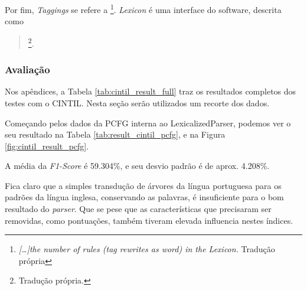 Por fim, \textit{Taggings} se refere a 
\footnote{\textit{[\ldots]the number of rules (tag rewrites as word) in the Lexicon.} Tradução própria}.
\textit{Lexicon} é uma interface do software, descrita como
\begin{quote}
    \footnote{ Tradução própria.}.
\end{quote}

\subsubsection{Avaliação} 
\label{subsubsec:result_aval_cintil}

Nos apêndices, a Tabela \ref{tab:cintil_result_full} traz os resultados completos dos testes com o CINTIL. Nesta seção serão utilizados um recorte dos dados.

Começando pelos dados da PCFG interna ao LexicalizedParser, podemos ver o seu resultado na Tabela \ref{tab:result_cintil_pcfg}, e na Figura \ref{fig:cintil_result_pcfg}.
\begin{center}
    
\end{center}

A média da \textit{F1-Score} é 59.304\%, e seu desvio padrão é de aprox. 4.208\%.

Fica claro que a simples transdução de árvores da língua portuguesa para os padrões da língua inglesa, conservando as palavras, é insuficiente para o bom resultado do \textit{parser}. Que se pese que as características que precisaram ser removidas, como pontuações, também tiveram elevada influencia nestes índices.

\begin{center}
    
\end{center}

